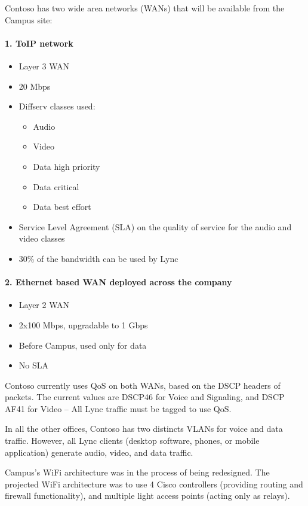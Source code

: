 	Contoso has two wide area networks (WANs) that will be available from the Campus site:
	\paragraph{1. ToIP network}
		\begin{itemize}
			\item Layer 3 WAN
			\item 20 Mbps
			\item Diffserv classes used: 
				\begin{itemize}
					\item Audio
					\item Video
					\item Data high priority
					\item Data critical
					\item Data best effort
				\end{itemize}
			\item Service Level Agreement (SLA) on the quality of service for the audio and video classes
			\item 30\% of the bandwidth can be used by Lync
		\end{itemize}

	\paragraph{2. Ethernet based WAN deployed across the company}
		\begin{itemize}
			\item Layer 2 WAN
			\item 2x100 Mbps, upgradable to 1 Gbps
			\item Before Campus, used only for data
			\item No SLA
		\end{itemize}
			
	
	Contoso currently uses QoS on both WANs, based on the DSCP headers of packets. The current values are DSCP46 for Voice and Signaling, and DSCP AF41 for Video -- 
	All Lync traffic must be tagged to use QoS.
	
	In all the other offices, Contoso has two distincts VLANs for voice and data traffic. However, all Lync clients (desktop software, phones, or mobile application) generate audio, video, and data traffic.
	
	Campus's WiFi architecture was in the process of being redesigned. The projected WiFi architecture was to use 4 Cisco controllers (providing routing and firewall functionality), and multiple light access points (acting only as relays).

